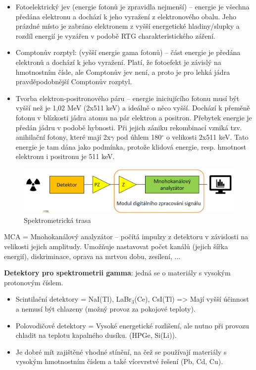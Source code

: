 \begin{itemize}
    \item Fotoelektrický jev (energie fotonů je zpravidla nejmenší) -- energie je všechna předána elektronu a dochází k jeho vyražení z elektronového obalu. Jeho prázdné místo je zabráno elektronem z vyšší energetické hladiny/slupky a rozdíl energií je vyzářen v podobě RTG charakteristického záření.

    \item Comptonův rozptyl: (vyšší energie gama fotonů) -- část energie je předána elektronů a dochází k jeho vyražení. Platí, že fotoefekt je závislý na hmotnostním čísle, ale Comptonův jev není, a proto je pro lehká jádra pravděpodobnější Comptonův rozptyl.

    \item Tvorba elektron-positronového páru -- energie iniciujícího fotonu musí být vyšší než je 1,02 MeV (2x511 keV) a ideálně o něco vyšší. Dochází k přeměně fotonu v blízkosti jádra atomu na pár elektron a positron. Přebytek energie je předán jádru v podobě hybnosti. Při jejich zániku rekombinací vzniká tzv. anihilační fotony, které mají 2x$\gamma$ pod úhlem 180$^\circ$ o velikosti 2x511 keV. Tato energie je tam dána jako podmínka, protože klidová energie, resp. hmotnost elektronu i positronu je 511 keV.
\end{itemize}

\begin{figure}[H]
\centering
	\includegraphics[width=0.8\linewidth]{img/spek-trasa.png}
	\caption{Spektrometrická trasa}
\end{figure}

MCA = Mnohokanálový analyzátor -- počítá impulzy z detektoru v závislosti na velikosti jejich amplitudy. Umožňuje nastavovat počet kanálů (jejich šířka energií), diskriminace, oprava na mrtvou dobu, zesílení, ...

\textbf{Detektory pro spektrometrii gamma}: jedná se o materiály s vysokým protonovým číslem.

\begin{itemize}
    \item Scintilační detektory = NaI(Tl), LaBr$_3$(Ce), CsI(Tl) => Mají vyšší účinnost a nemusí být chlazeny (možný provoz za pokojové teploty).
    \item Polovodičové detektory = Vysoké energetické rozlišení, ale nutno při provozu chladit na teplotu kapalného dusíku. (HPGe, Si(Li)).
    \item Je dobré mít zajištěné vhodné stínění, na čež se používají materiály s vysokým hmotnostním číslem a také vícevrstvé řešení (Pb, Cd, Cu).
\end{itemize}



